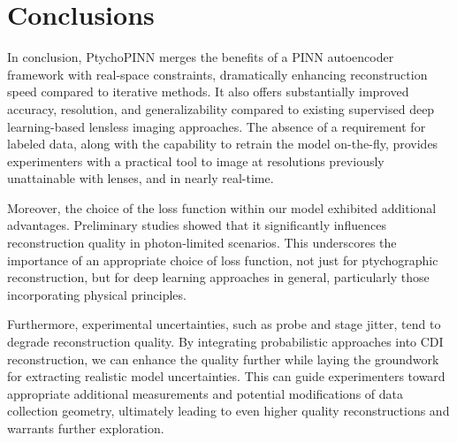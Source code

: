 \documentclass[sn-mathphys]{sn-jnl}%
\theoremstyle{thmstyleone}%
\theoremstyle{thmstyletwo}%
\theoremstyle{thmstylethree}%
\begin{document}
\section{Conclusions}
In conclusion, PtychoPINN merges the benefits of a PINN autoencoder framework with real-space constraints, dramatically enhancing reconstruction speed compared to iterative methods. It also offers substantially improved accuracy, resolution, and generalizability compared to existing supervised deep learning-based lensless imaging approaches. The absence of a requirement for labeled data, along with the capability to retrain the model on-the-fly, provides experimenters with a practical tool to image at resolutions previously unattainable with lenses, and in nearly real-time.



Moreover, the choice of the loss function within our model exhibited additional advantages. Preliminary studies showed that it significantly influences reconstruction quality in photon-limited scenarios. This underscores the importance of an appropriate choice of loss function, not just for ptychographic reconstruction, but for deep learning approaches in general, particularly those incorporating physical principles. 

Furthermore, experimental uncertainties, such as probe and stage jitter, tend to degrade reconstruction quality. By integrating probabilistic approaches into CDI reconstruction, we can enhance the quality further while laying the groundwork for extracting realistic model uncertainties. This can guide experimenters toward appropriate additional measurements and potential modifications of data collection geometry, ultimately leading to even higher quality reconstructions and warrants further exploration.
\end{document}
